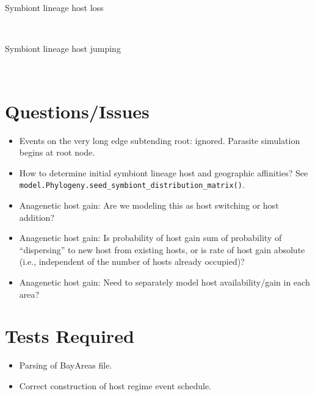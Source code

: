 \documentclass[11pt]{article}
\begin{document}
\begin{description}
    \item[Symbiont lineage host loss]  \hfill \\
        \begin{minipage}[t]{\linewidth}
        \end{minipage}
    \item[Symbiont lineage host jumping]  \hfill \\
        \begin{minipage}[t]{\linewidth}
        \end{minipage}
\end{description}

\section{Questions/Issues}
\begin{itemize}
    \item   Events on the very long edge subtending root: ignored. Parasite simulation begins at root node.
    \item   How to determine initial symbiont lineage host and geographic affinities? See \verb+model.Phylogeny.seed_symbiont_distribution_matrix()+.
    \item   Anagenetic host gain: Are we modeling this as host switching or host addition?
    \item   Anagenetic host gain: Is probability of host gain sum of probability of ``dispersing'' to new host from existing hosts, or is rate of host gain absolute (i.e., independent of the number of hosts already occupied)?
    \item   Anagenetic host gain: Need to separately model host availability/gain in each area?

\end{itemize}

\section{Tests Required}
\begin{itemize}
    \item Parsing of BayAreas file.
    \item Correct construction of  host regime event schedule.

\end{itemize}
\end{document}
